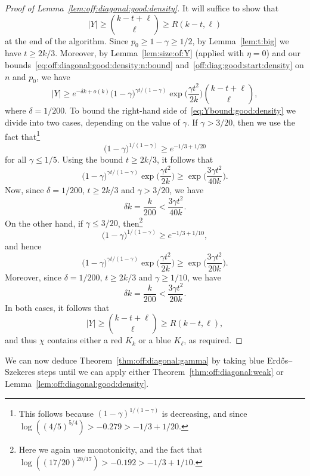 \documentclass[12pt,reqno]{amsart}
\theoremstyle{definition}
\theoremstyle{remark}
\renewcommand{\le}{\leqslant}
\renewcommand{\ge}{\geqslant}
\begin{document}
\begin{proof}[Proof of Lemma~\ref{lem:off:diagonal:good:density}]
It will suffice to show that
$$|Y| \ge {k-t+\ell \choose \ell} \ge R(k-t,\ell)$$
at the end of the algorithm. Since $p_0 \ge 1 - \gamma \ge 1/2$, by Lemma~\ref{lem:t:big} we have $t \ge 2k/3$. Moreover, by Lemma~\ref{lem:size:of:Y} (applied with $\eta = 0$) and our bounds~\eqref{eq:off:diagonal:good:density:n:bound} and~\eqref{off:diag:good:start:density} on $n$ and $p_0$, we have 
\begin{equation}\label{eq:Ybound:good:density}
|Y| \ge e^{-\delta k + o(k)} \big( 1 - \gamma \big)^{\gamma t / (1 - \gamma)} \exp\bigg( \frac{\gamma t^2}{2k} \bigg) {k-t+\ell \choose \ell},
\end{equation}
where $\delta = 1/200$. To bound the right-hand side of~\eqref{eq:Ybound:good:density} we divide into two cases, depending on the value of $\gamma$. If $\gamma > 3/20$, then we use the fact that\footnote{This follows because $(1 - \gamma)^{1 / (1 - \gamma)}$ is decreasing, and since $\log( (4/5)^{5/4}) > -0.279 > -1/3 + 1/20$.}
$$\big( 1 - \gamma \big)^{1 / (1 - \gamma)} \ge e^{-1/3 + 1/20}$$
for all $\gamma \le 1/5$. Using the bound $t \ge 2k / 3$, it follows that
$$\big( 1 - \gamma \big)^{\gamma t / (1 - \gamma)} \exp\bigg( \frac{\gamma t^2}{2k} \bigg) \ge \exp\bigg( \frac{3\gamma t^2}{40k} \bigg).$$
Now, since $\delta = 1/200$, $t \ge 2k/3$ and $\gamma > 3/20$, we have
$$\delta k = \frac{k}{200} < \frac{3\gamma t^2}{40k}.$$
On the other hand, if $\gamma \le 3/20$, then\footnote{Here we again use monotonicity, and the fact that $\log( (17/20)^{20/17} ) > -0.192 > -1/3 + 1/10$.} 
$$\big( 1 - \gamma \big)^{1 / (1 - \gamma)} \ge e^{-1/3 + 1/10},$$
and hence
$$\big( 1 - \gamma \big)^{\gamma t / (1 - \gamma)} \exp\bigg( \frac{\gamma t^2}{2k} \bigg) \ge \exp\bigg( \frac{3\gamma t^2}{20k} \bigg).$$
Moreover, since $\delta = 1/200$, $t \ge 2k/3$ and $\gamma \ge 1/10$, we have
$$\delta k = \frac{k}{200} < \frac{3\gamma t^2}{20k}.$$
In both cases, it follows that
$$|Y| \ge {k-t+\ell \choose \ell} \ge R(k-t,\ell),$$
and thus $\chi$ contains either a red $K_k$ or a blue $K_\ell$, as required.
\end{proof}

We can now deduce Theorem~\ref{thm:off:diagonal:gamma} by taking blue Erd\H{o}s--Szekeres steps until we can apply either Theorem~\ref{thm:off:diagonal:weak} or Lemma~\ref{lem:off:diagonal:good:density}.
\end{document}
